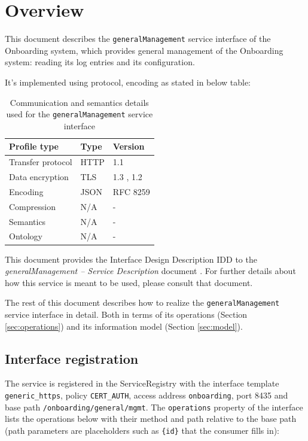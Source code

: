 \documentclass[a4paper]{arrowhead}
\begin{document}
\section{Overview}
\label{sec:overview}

This document describes the \texttt{generalManagement} service interface of the Onboarding system, which provides general management of the Onboarding system: reading its log entries and its configuration.

It's implemented using protocol, encoding as stated in below table:
\begin{table}[ht!]
  \centering
  \begin{tabular}{|l|l|l|}
    \hline
    \rowcolor{gray!33} Profile type & Type & Version \\ \hline
    Transfer protocol & HTTP & 1.1 \cite{rfc9112} \\ \hline
    Data encryption & TLS & 1.3 \cite{rfc8446}, 1.2 \cite{rfc5246} \\ \hline
    Encoding & JSON & RFC 8259 \cite{rfc8259} \\ \hline
    Compression & N/A & - \\ \hline
    Semantics & N/A & - \\ \hline
    Ontology & N/A & - \\ \hline
  \end{tabular}
  \caption{Communication and semantics details used for the \texttt{generalManagement} service interface}
  \label{tab:comunication_semantics_profile}
\end{table}

This document provides the Interface Design Description IDD to the \textit{generalManagement -- Service Description} document \cite{onb-generalManagement-sd}.
For further details about how this service is meant to be used, please consult that document.

The rest of this document describes how to realize the \texttt{generalManagement} service
interface in detail. Both in terms of its operations (Section \ref{sec:operations}) and its information model (Section \ref{sec:model}).

\subsection{Interface registration}

The service is registered in the ServiceRegistry with the interface template \texttt{generic\_\allowbreak{}https}, policy \texttt{CERT\_\allowbreak{}AUTH}, access address \texttt{onboarding}, port 8435 and base path \texttt{/\allowbreak{}onboarding/\allowbreak{}general/\allowbreak{}mgmt}. The \texttt{operations} property of the interface lists the operations below with their method and path relative to the base path (path parameters are placeholders such as \texttt{\{id\}} that the consumer fills in):
\end{document}
